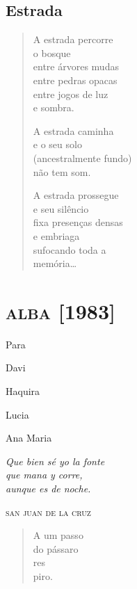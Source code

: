\chapter{Estrada}

\begin{verse}
A estrada percorre\\
\qquad\qquad o bosque\\
entre árvores mudas\\
entre pedras opacas\\
entre jogos de luz\\
\qquad\qquad e sombra.

A estrada caminha\\
e o seu solo\\
(ancestralmente fundo)\\
não tem som.

A estrada prossegue\\
e seu silêncio\\
fixa presenças densas\\
e embriaga\\
sufocando toda a\\
\qquad\qquad memória\ldots{}
\end{verse}


\part{\textsc{alba} {[}1983{]}}

\thispagestyle{empty}

\mbox{}
\vfill
Para

Davi

Haquira

Lucia

Ana Maria

\pagebreak
\thispagestyle{empty}

\mbox{}
\vfill
\setlength{\epigraphwidth}{.3\textwidth}
\epigraph{\emph{Que bien sé yo la fonte}\\
\emph{que mana y corre,}\\
\emph{aunque es de noche.}}{\textsc{san juan de la cruz}}

\pagebreak
\thispagestyle{empty}

\mbox{}\vfill
\begin{verse}
A um passo\\
do pássaro\\
res\\
piro.
\end{verse}

